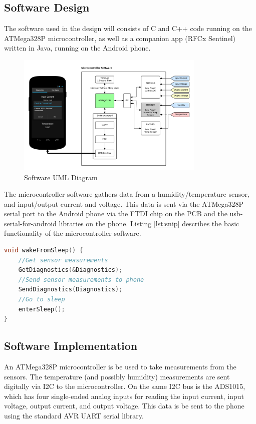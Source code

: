\documentclass{article}
\numberwithin{figure}{section}
\numberwithin{equation}{section}
\begin{document}
{\newpage
\subsection{Software Design} \label{sect:softwaredes}
The software used in the design will consists of C and C++ code running on the ATMega328P microcontroller, as well as a companion app (RFCx Sentinel) written in Java, running on the Android phone.
\begin{figure}[H]
	\centering
	\includegraphics[width=0.8\textwidth]{SoftwareUMLV2}
	\caption{Software UML Diagram}
	\label{fig:swuml}
\end{figure}

The microcontroller software gathers data from a humidity/temperature sensor, and input/output current and voltage. This data is sent via the ATMega328P serial port to the Android phone via the FTDI chip on the PCB and the usb-serial-for-android libraries on the phone.
Listing \ref{lst:snip} describes the basic functionality of the microcontroller software.

\begin{lstlisting}[language=C,label=lst:snip,caption=MCU Flow Code Snippet]
void wakeFromSleep() {
    //Get sensor measurements
    GetDiagnostics(&Diagnostics);
    //Send sensor measurements to phone
    SendDiagnostics(Diagnostics);
    //Go to sleep
    enterSleep();
}
\end{lstlisting}

\subsection{Software Implementation} \label{sect:softwareimp}
An ATMega328P microcontroller is be used to take measurements from the sensors. The temperature (and possibly humidity) measurements are sent digitally via I2C to the microcontroller. On the same I2C bus is the ADS1015, which has four single-ended analog inputs for reading the input current, input voltage, output current, and output voltage. This data is be sent to the phone using the standard AVR UART serial library.

}
\end{document}
